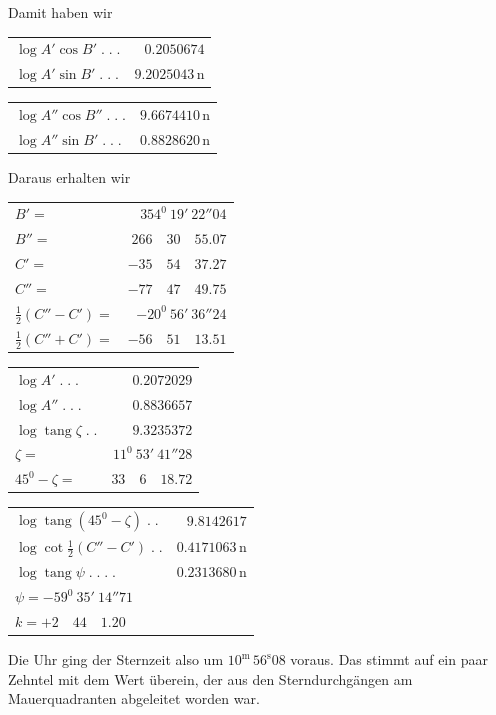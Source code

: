 Damit haben wir
\begin{center}\small
\begin{minipage}[t]{.49\textwidth}\centering
\begin{tabular}[t]{@{}lr@{}}
$\log A'\cos B'\;.\;.\;.$&$0.2050674$\\
$\log A'\sin B'\;.\;.\;.$&$9.2025043\,\mathrm n$
\end{tabular}
\end{minipage}\hfill
\begin{minipage}[t]{.49\textwidth}\centering
\begin{tabular}[t]{@{}lr@{}}
$\log A''\cos B''\;.\;.\;.$&$9.6674410\,\mathrm n$\\
$\log A''\sin B'\;.\;.\;.$&$0.8828620\,\mathrm n$
\end{tabular}
\end{minipage}
\end{center}
Daraus erhalten wir
\begin{center}\small
\begin{minipage}[t]{.49\textwidth}\centering
\begin{tabular}[t]{@{}lr@{}}
$B'=$&$354^0\ 19'\ 22''04$\\
$B''=$&$266\quad30\quad55.07$\\[6pt]
$C'=$&$-35\quad54\quad37.27$\\
$C''=$&$-77\quad47\quad49.75$\\[6pt]
$\tfrac12(C''-C')=$&$-20^0\ 56'\ 36''24$\\
$\tfrac12(C''+C')=$&$-56\quad51\quad13.51$
\end{tabular}
\end{minipage}\hfill
\begin{minipage}[t]{.49\textwidth}\centering
\begin{tabular}[t]{@{}lr@{}}
$\log A'\;.\;.\;.$&$0.2072029$\\
$\log A''\;.\;.\;.$&$0.8836657$\\[6pt]
$\log\operatorname{tang}\zeta\;.\;.$&$9.3235372$\\
$\zeta=$&$11^0\ 53'\ 41''28$\\[6pt]
$45^0-\zeta=$&$33\quad6\quad18.72$
\end{tabular}
\end{minipage}
\par\medskip
\begin{tabular}{lr}
$\log\operatorname{tang}(45^0-\zeta)\;.\;.$&$9.8142617$\\
$\log\cot\tfrac12(C''-C')\;.\;.$&$0.4171063\,\mathrm n$\\\hline
$\log\operatorname{tang}\psi\;.\;.\;.\;.$&$0.2313680\,\mathrm n$\\
\multicolumn{2}{l}{$\psi=-59^0\ 35'\ 14''71$}\\
\multicolumn{2}{l}{$k=+2\quad44\quad1.20$}
\end{tabular}
\end{center}
Die Uhr ging der Sternzeit also um $10^{\mathrm m}\,56^{\mathrm s}08$ voraus.
%
Das stimmt auf ein paar Zehntel mit dem Wert überein, der aus den Sterndurchgängen am Mauerquadranten abgeleitet worden war.


